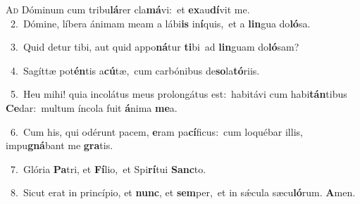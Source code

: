 \lettrine{\initial\textcolor{\initialcolor}{A}}{d} Dóminum cum tribu\-\textbf{lá}\-rer cla\-\textbf{má}\-vi:~\star et \textbf{ex}\-au\-\textbf{dí}\-vit me.\\
{\numbfont\textcolor{\numbcolor}{~2.}}~Dómine, líbera ánimam meam a lábi\textbf{is} in\-\textbf{í}\-quis,~\star et a \textbf{lin}\-gua do\-\textbf{ló}\-sa.\par
{\numbfont\textcolor{\numbcolor}{~3.}}~Quid detur tibi, aut quid appo\-\textbf{ná}\-tur \textbf{ti}\-bi~\star ad \textbf{lin}\-guam do\-\textbf{ló}\-sam?\par
{\numbfont\textcolor{\numbcolor}{~4.}}~Sagíttæ pot\-\textbf{én}\-tis a\-\textbf{cú}\-tæ,~\star cum carbónibus de\-\textbf{so}\-la\-\textbf{tó}\-riis.\par
{\numbfont\textcolor{\numbcolor}{~5.}}~Heu mihi! quia incolátus meus prolongátus est:~\dagger habitávi cum habi\-\textbf{tán}\-tibus \textbf{Ce}\-dar:~\star multum íncola fuit \textbf{á}\-nima \textbf{me}\-a.\par
{\numbfont\textcolor{\numbcolor}{~6.}}~Cum his, qui odérunt pacem, \textbf{e}\-ram pa\-\textbf{cí}\-ficus:~\star cum loquébar illis, impu\-\textbf{gná}\-bant me \textbf{gra}\-tis.\par
{\numbfont\textcolor{\numbcolor}{~7.}}~Glória \textbf{Pa}\-tri, et \textbf{Fí}\-lio,~\star et Spi\-\textbf{rí}\-tui \textbf{Sanc}\-to.\par
{\numbfont\textcolor{\numbcolor}{~8.}}~Sicut erat in princípio, et \textbf{nunc}\-, et \textbf{sem}\-per,~\star et in sǽcula sæcu\-\textbf{ló}\-rum. \textbf{A}\-men.\par
